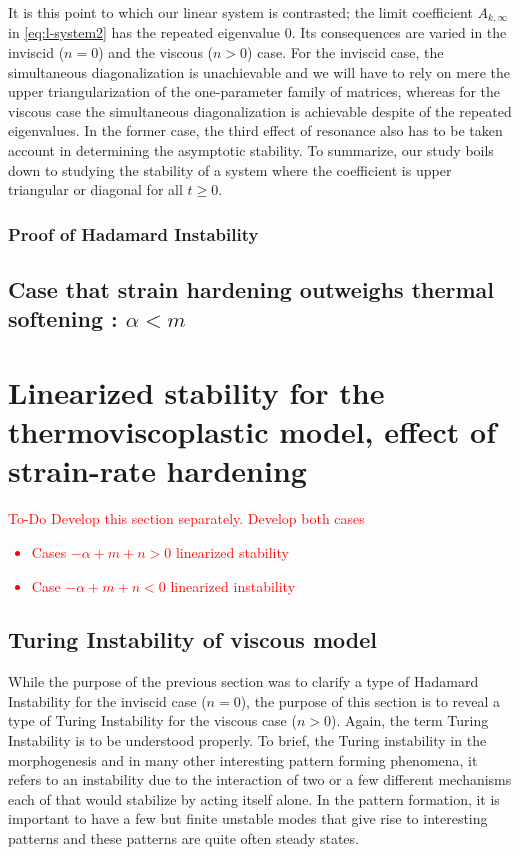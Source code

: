 \documentclass[a4paper,11pt]{article}
\newcommand{\tcr}{\textcolor{red}}
\theoremstyle{remark}
\begin{document}
It is this point to which our linear system is contrasted; the limit coefficient $A_{k,\infty}$ in \eqref{eq:l-system2} has the repeated eigenvalue $0$. Its consequences are varied in the inviscid ($n=0$) and the viscous ($n>0$) case. For the inviscid case, the simultaneous diagonalization is unachievable and we will have to rely on mere the upper triangularization of the one-parameter family of matrices, whereas for the viscous case the simultaneous diagonalization is achievable despite of the repeated eigenvalues. In the former case, the third effect of resonance also has to be taken account in determining the asymptotic stability. To summarize, our study boils down to studying the stability of a system where the coefficient is upper triangular or diagonal for all $t\ge0$.




\subsubsection{Proof of Hadamard Instability}




\subsection{Case that  strain hardening outweighs   thermal softening : $\alpha < m$}



\vfil\eject


\section{Linearized stability for the thermoviscoplastic model, effect of strain-rate hardening}

\tcr{ To-Do  Develop this section separately. Develop both cases
\begin{itemize}
\item Cases $-\alpha + m + n  > 0$ linearized stability
\item Case $-\alpha + m + n  <  0$ linearized instability
\end{itemize}
}

\subsection{Turing Instability of viscous model}
While the purpose of the previous section was to clarify a type of Hadamard Instability for the inviscid case ($n=0$), the purpose of this section is to reveal a type of Turing Instability for the viscous case ($n>0$). Again, the term Turing Instability is to be understood properly. To brief, the Turing instability in the {morphogenesis} and in many other interesting pattern forming phenomena, it refers to an instability due to the interaction of two or a few different  mechanisms each of that would stabilize by acting itself alone. In the pattern formation, it is important to have a few but finite unstable modes that give rise to interesting patterns and these patterns are quite often steady states.
\end{document}
